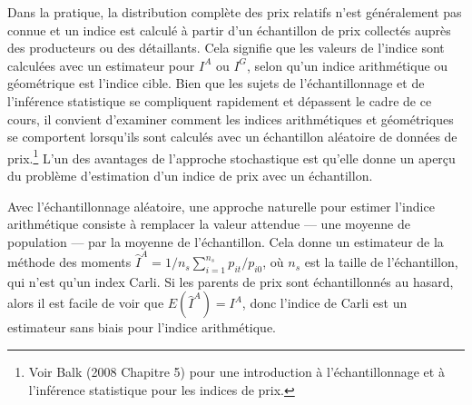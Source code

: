 \documentclass[]{article}
\begin{document}
Dans la pratique, la distribution complète des prix relatifs n'est généralement pas connue et un indice est calculé à partir d'un échantillon de prix collectés auprès des producteurs ou des détaillants. Cela signifie que les valeurs de l'indice sont calculées avec un estimateur pour \(I^{A}\) ou \(I^{G}\), selon qu'un indice arithmétique ou géométrique est l'indice cible. Bien que les sujets de l'échantillonnage et de l'inférence statistique se compliquent rapidement et dépassent le cadre de ce cours, il convient d'examiner comment les indices arithmétiques et géométriques se comportent lorsqu'ils sont calculés avec un échantillon aléatoire de données de prix.\footnote{Voir Balk (2008 Chapitre 5) pour une introduction à l'échantillonnage et à l'inférence statistique pour les indices de prix.} L'un des avantages de l'approche stochastique est qu'elle donne un aperçu du problème d'estimation d'un indice de prix avec un échantillon.

Avec l'échantillonnage aléatoire, une approche naturelle pour estimer l'indice arithmétique consiste à remplacer la valeur attendue --- une moyenne de population --- par la moyenne de l'échantillon. Cela donne un estimateur de la méthode des moments \(\hat {I}^A = 1 / n_{s} \sum_{i = 1}^{n_{s}} p_{it} / p_{i0}\), où \(n_{s}\) est la taille de l'échantillon, qui n'est qu'un index Carli. Si les parents de prix sont échantillonnés au hasard, alors il est facile de voir que \(E(\hat {I}^{A}) = I^{A}\), donc l'indice de Carli est un estimateur sans biais pour l'indice arithmétique.
\end{document}
